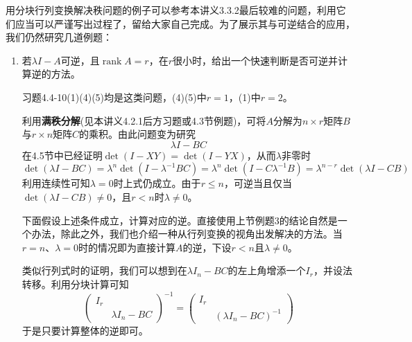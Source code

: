 \documentclass[a4paper,UTF8,fontset=windows]{ctexart}
\DeclareMathOperator{\rank}{rank}
\newcommand*{\note}{\noindent *}
\begin{document}
用分块行列变换解决秩问题的例子可以参考本讲义3.3.2最后较难的问题，利用它们应当可以严谨写出过程了，留给大家自己完成。为了展示其与可逆结合的应用，我们仍然研究几道例题：
\begin{enumerate}
    \item 若$\lambda I-A$可逆，且$\rank A=r$，在$r$很小时，给出一个快速判断是否可逆并计算逆的方法。
    
    \note 习题4.4-10(1)(4)(5)均是这类问题，(4)(5)中$r=1$，(1)中$r=2$。

    利用\textbf{满秩分解}(见本讲义4.2.1后方习题或4.3节例题)，可将$A$分解为$n\times r$矩阵$B$与$r\times n$矩阵$C$的乘积。由此问题变为研究
    $$\lambda I-BC$$
    在4.5节中已经证明$\det(I-XY)=\det(I-YX)$，从而$\lambda$非零时
    $$\det(\lambda I-BC)=\lambda^n\det(I-\lambda^{-1}BC)=\lambda^n\det(I-C\lambda^{-1}B)=\lambda^{n-r}\det(\lambda I-CB)$$
    利用连续性可知$\lambda=0$时上式仍成立。由于$r\le n$，可逆当且仅当$\det(\lambda I-CB)\ne0$，且$r<n$时$\lambda\ne0$。
    
    下面假设上述条件成立，计算对应的逆。直接使用上节例题3的结论自然是一个办法，除此之外，我们也介绍一种从行列变换的视角出发解决的方法。当$r=n$、$\lambda=0$时的情况即为直接计算$A$的逆，下设$r<n$且$\lambda\ne0$。

    类似行列式时的证明，我们可以想到在$\lambda I_n-BC$的左上角增添一个$I_r$，并设法转移。利用分块计算可知
    $$\begin{pmatrix}I_r&\\ &\lambda I_n-BC\end{pmatrix}^{-1}=\begin{pmatrix}I_r&\\ &(\lambda I_n-BC)^{-1}\end{pmatrix}$$
    于是只要计算整体的逆即可。


\end{enumerate}
\end{document}
